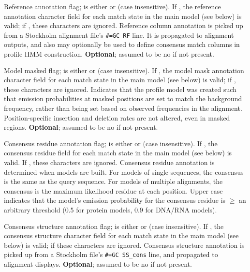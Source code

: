 \begin{sreitems}{}
\item [\emprog{RF <s>}] Reference annotation flag;  is
either  or  (case insensitive). If , the
reference annotation character field for each match state in the main
model (see below) is valid; if , these characters are
ignored.  Reference column annotation is picked up from a Stockholm
alignment file's \verb+#=GC RF+ line. It is propagated to alignment
outputs, and also may optionally be used to define consensus match
columns in profile HMM construction. \textbf{Optional}; assumed to be
no if not present.

\item [\emprog{MM <s>}] Model masked flag;  is
either  or  (case insensitive). If , the
model mask annotation character field for each match state in the main
model (see below) is valid; if , these characters are
ignored. Indicates that the profile model was created such that
emission probabilities at masked positions are set to match the 
background frequency, rather than being set based on observed frequencies 
in the alignment. Position-specific insertion and deletion rates are not 
altered, even in masked regions. \textbf{Optional}; assumed to be
no if not present.

\item [\emprog{CONS <s>}] Consensus residue annotation flag;
   is either  or  (case insensitive).  If
  , the consensus residue field for each match state in the
  main model (see below) is valid. If , these characters are
  ignored. Consensus residue annotation is determined when models are
  built. For models of single sequences, the consensus is the same as
  the query sequence. For models of multiple alignments, the consensus
  is the maximum likelihood residue at each position. Upper case
  indicates that the model's emission probability for the consensus
  residue is $\geq$ an arbitrary threshold (0.5 for protein models,
  0.9 for DNA/RNA models).

\item [\emprog{CS <s>}] Consensus structure annotation flag;
 is either  or  (case insensitive). If
, the consensus structure character field for each match
state in the main model (see below) is valid; if  these
characters are ignored. Consensus structure annotation is picked up
from a Stockholm file's \verb+#=GC SS_cons+ line, and propagated to
alignment displays.  \textbf{Optional}; assumed to be no if not
present.


\end{sreitems}
